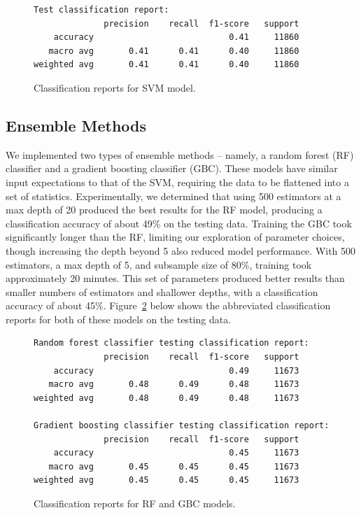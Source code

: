 \documentclass[12pt]{article}
\begin{document}
\begin{figure}[htbp]
  \centering
  \begin{minipage}{0.7\textwidth}
    \begin{lstlisting}[label={lst:svm-output}]
Test classification report:
              precision    recall  f1-score   support
    accuracy                           0.41     11860
   macro avg       0.41      0.41      0.40     11860
weighted avg       0.41      0.41      0.40     11860\end{lstlisting}
  \end{minipage}
  \caption{Classification reports for SVM model.}
  \label{fig:svm-report}
\end{figure}

\subsection{Ensemble Methods}
\label{subsec:ensemble-methods}
We implemented two types of ensemble methods -- namely, a random forest (RF) classifier and a gradient boosting classifier (GBC).
These models have similar input expectations to that of the SVM, requiring the data to be flattened into a set of statistics.
Experimentally, we determined that using 500 estimators at a max depth of 20 produced the best results for the RF model, producing a classification accuracy of about 49\% on the testing data.
Training the GBC took significantly longer than the RF, limiting our exploration of parameter choices, though increasing the depth beyond 5 also reduced model performance.
With 500 estimators, a max depth of 5, and subsample size of 80\%, training took approximately 20 minutes.
This set of parameters produced better results than smaller numbers of estimators and shallower depths, with a classification accuracy of about 45\%.
Figure~\ref{fig:ensemble-report} below shows the abbreviated classification reports for both of these models on the testing data.

\begin{figure}[htbp]
  \centering
  \begin{minipage}{0.7\textwidth}
    \begin{lstlisting}[label={lst:ensemble-output}]
Random forest classifier testing classification report:
              precision    recall  f1-score   support
    accuracy                           0.49     11673
   macro avg       0.48      0.49      0.48     11673
weighted avg       0.48      0.49      0.48     11673

Gradient boosting classifier testing classification report:
              precision    recall  f1-score   support
    accuracy                           0.45     11673
   macro avg       0.45      0.45      0.45     11673
weighted avg       0.45      0.45      0.45     11673\end{lstlisting}
  \end{minipage}
  \caption{Classification reports for RF and GBC models.}
  \label{fig:ensemble-report}
\end{figure}
\end{document}
